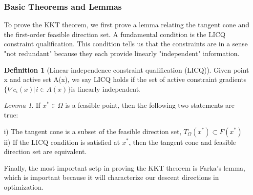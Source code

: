 \documentclass[class=article, crop=false]{standalone}
\theoremstyle{definition}
\newtheorem{definition}{Definition}[section]
\theoremstyle{remark}
\theoremstyle{lemma}
\newtheorem*{lemma}{Lemma}
\theoremstyle{theorem}
\theoremstyle{corollary}
\theoremstyle{property}
\begin{document}
		\subsubsection{Basic Theorems and Lemmas}
			To prove the KKT theorem, we first prove a lemma relating the tangent cone and the first-order feasible direction set. A fundamental condition is the LICQ constraint qualification. This condition tells us that the constraints are in a sense "not redundant" because they each provide linearly "independent" information.

			\begin{definition}[Linear independence constraint qualification (LICQ)]
				Given point x and active set A(x), we say LICQ holds if the set of active constraint gradients $\{\nabla c_i(x) | i \in A(x) \}$is linearly independent.
			\end{definition}

			\begin{lemma}
				If $x^* \in \Omega$ is a feasible point, then the following two statements are true:

				i) The tangent cone is a subset of the feasible direction set, $T_\Omega(x^*) \subset F(x^*)$
				ii) If the LICQ condition is satisfied at $x^*$, then the tangent cone and feasible direction set are equivalent.
			\end{lemma}

			Finally, the most important setp in proving the KKT theorem is Farka's lemma, which is important because it will characterize our descent directions in optimization.
\end{document}
